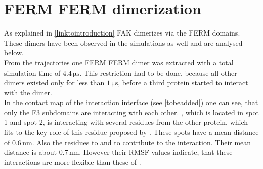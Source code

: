 \section{FERM FERM dimerization}
As explained in \autoref{linktointroduction} FAK dimerizes via the FERM domains. These dimers have been observed in the simulations as well and are analysed below.\\ %
From the trajectories one FERM FERM dimer was extracted with a total simulation time of $4.4\,\si{\micro\second}$. This restriction had to be done, because all other dimers existed only for less than $1\,\si{\micro\second}$, before a third protein started to interact with the dimer.\\
In the contact map of the interaction interface (see \autoref{tobeadded}) one can see, that only the F3 subdomains are interacting with each other. , which is located in spot 1 and spot 2, is interacting with several residues from the other protein, which fits to the key role of this residue proposed by \textcite{fermdimer}. These spots have a mean distance of $0.6\,\si{\nano\metre}$. Also the residues  to  and  to  contribute to the interaction. Their mean distance is about $0.7\,\si{\nano\metre}$. However their RMSF values indicate, that these interactions are more flexible than these of .\\


